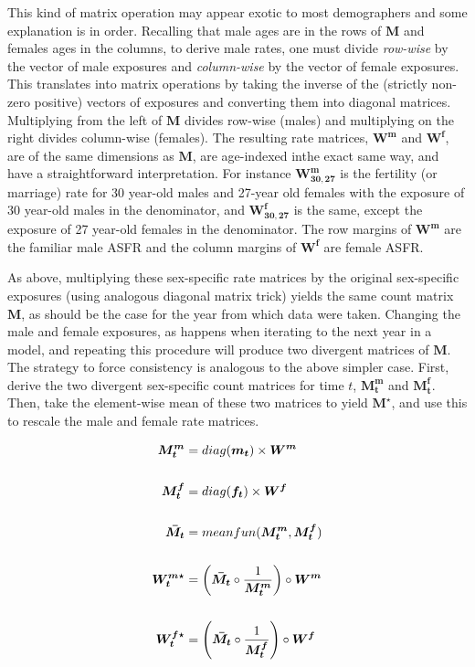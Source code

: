 This kind of matrix operation may appear exotic to most demographers and some explanation is in order. Recalling that male ages are in the rows of $\bm{M}$ and females ages in the columns, to derive male rates, one must divide \textit{row-wise} by the vector of male exposures and \textit{column-wise} by the vector of female exposures. This translates into matrix operations by taking the inverse of the (strictly non-zero positive) vectors of exposures and converting them into diagonal matrices. Multiplying from the left of $\bm{M}$ divides row-wise (males) and multiplying on the right divides column-wise (females). The resulting rate matrices, $\bm{W^m}$ and $\bm{W^f}$, are of the same dimensions as $\bm{M}$, are age-indexed inthe exact same way, and have a straightforward interpretation. For instance $\bm{W_{30,27}^m}$ is the fertility (or marriage) rate for 30 year-old males and 27-year old females with the exposure of 30 year-old males in the denominator, and $\bm{W_{30,27}^f}$ is the same, except the exposure of 27 year-old females in the denominator. The row margins of $\bm{W^m}$ are the familiar male ASFR and the column margins of $\bm{W^f}$ are female ASFR.

As above, multiplying these sex-specific rate matrices by the original sex-specific exposures (using analogous diagonal matrix trick) yields the same count matrix $\bm{M}$, as should be the case for the year from which data were taken. Changing the male and female exposures, as happens when iterating to the next year in a model, and repeating this procedure will produce two divergent matrices of $\bm{M}$. The strategy to force consistency is analogous to the above simpler case. First, derive the two divergent sex-specific count matrices for time $t$, $\bm{M_t^m}$ and $\bm{M_t^f}$. Then, take the element-wise mean of these two matrices to yield $\bm{M^{\star}}$, and use this to rescale the male and female rate matrices. 

\begin{align}
\bm{M_{t}^{m}} &= diag(\bm{m_t}) \times \bm{W^m} \notag \\ \notag \\
\bm{M_{t}^{f}} &= diag(\bm{f_t}) \times \bm{W^f} \\ \notag \\
\bm{\bar{M_{t}}} &= meanfun(\bm{M_{t}^{m}},\bm{M_{t}^{f}}) \\ \notag \\
\bm{W_t^{m\star}} &= \left(\bm{\bar{M_{t}}} \circ \frac{1}{\bm{M_{t}^{m}}}\right) \circ \bm{W^m} \notag \\ \notag \\
\bm{W_t^{f\star}} &= \left(\bm{\bar{M_{t}}} \circ \frac{1}{\bm{M_{t}^{f}}}\right) \circ \bm{W^f}
\end{align}

